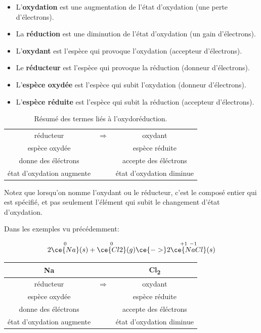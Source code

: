 \documentclass[
  11pt,
  a4paper,
  openany]{book}
\providecommand{\tightlist}{%
  \setlength{\itemsep}{0pt}\setlength{\parskip}{0pt}}
\begin{document}
\begin{itemize}
\tightlist
\item
  L'\textbf{oxydation} est une augmentation de l'état d'oxydation (une perte d'électrons).
\item
  La \textbf{réduction} est une diminution de l'état d'oxydation (un gain d'électrons).
\item
  L'\textbf{oxydant} est l'espèce qui provoque l'oxydation (accepteur d'électrons).
\item
  Le \textbf{réducteur} est l'espèce qui provoque la réduction (donneur d'électrons).
\item
  L'\textbf{espèce oxydée} est l'espèce qui subit l'oxydation (donneur d'électrons).
\item
  L'\textbf{espèce réduite} est l'espèce qui subit la réduction (accepteur d'électrons).
\end{itemize}

\begin{longtable}[]{@{}ccc@{}}
\caption{\label{tab:tab-NO-summary} Résumé des termes liés à l'oxydoréduction.}\tabularnewline
\toprule()
\endhead
réducteur & \(\Rightarrow\) & oxydant \\
espèce oxydée & & espèce réduite \\
donne des éléctrons & & accepte des éléctrons \\
état d'oxydation augmente & & état d'oxydation diminue \\
\bottomrule()
\end{longtable}

Notez que lorsqu'on nomme l'oxydant ou le réducteur, c'est le composé entier qui est spécifié, et pas seulement l'élément qui subit le changement d'état d'oxydation.

Dans les exemples vu précédemment:

\[
2\overset{0}{\ce{Na}}(s) + \overset{0}{\ce{Cl2}}(g) \ce{->} 2\overset{+1\ -1}{\ce{NaCl}}(s)
\]

\begin{longtable}[]{@{}ccc@{}}
\toprule()
Na & & Cl\textsubscript{2} \\
\midrule()
\endhead
réducteur & \(\Rightarrow\) & oxydant \\
espèce oxydée & & espèce réduite \\
donne des éléctrons & & accepte des éléctrons \\
état d'oxydation augmente & & état d'oxydation diminue \\
\bottomrule()
\end{longtable}
\end{document}
